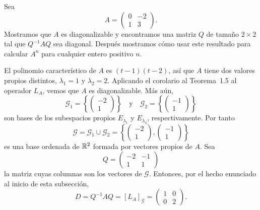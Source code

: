 \documentclass[12pt,a4paper]{book}
\begin{document}
    \begin{ejemplo}
        Sea
        \begin{equation*}
            A=\begin{pmatrix}0&-2\\1&3\end{pmatrix}.
        \end{equation*}
        Mostramos que $A$ es diagonalizable y encontramos una matriz $Q$ de tamaño $2\times2$ tal que $Q^{-1}AQ$ sea diagonal. Después mostramos cómo usar este resultado para calcular $A^n$ para cualquier entero positivo $n$.

        El polinomio característico de $A$ es $(t-1)(t-2)$, así que $A$ tiene dos valores propios distintos, $\lambda_1=1$ y $\lambda_2=2$. Aplicando el corolario al Teorema~1.5 al operador $L_A$, vemos que $A$ es diagonalizable. Más aún,
        \begin{equation*}
            \mathcal{G}_1=\left\{\begin{pmatrix}-2\\1\end{pmatrix}\right\}
            \quad\text{y}\quad
            \mathcal{G}_2=\left\{\begin{pmatrix}-1\\1\end{pmatrix}\right\}
        \end{equation*}
        son bases de los subespacios propios $E_{\lambda_1}$ y $E_{\lambda_2}$, respectivamente. Por tanto
        \begin{equation*}
            \mathcal{G}=\mathcal{G}_1\cup\mathcal{G}_2=\left\{\begin{pmatrix}-2\\1\end{pmatrix}, \begin{pmatrix}-1\\1\end{pmatrix}\right\}
        \end{equation*}
        es una base ordenada de $\mathbb{R}^2$ formada por vectores propios de $A$. Sea
        \begin{equation*}
            Q=\begin{pmatrix}-2&-1\\1&1\end{pmatrix}
        \end{equation*}
        la matriz cuyas columnas son los vectores de $\mathcal{G}$. Entonces, por el hecho enunciado al inicio de esta subsección,
        \begin{equation*}
            D=Q^{-1}AQ=[L_A]_{\mathcal{G}}=\begin{pmatrix}1&0\\0&2\end{pmatrix}.
        \end{equation*}


\end{ejemplo}
\end{document}

